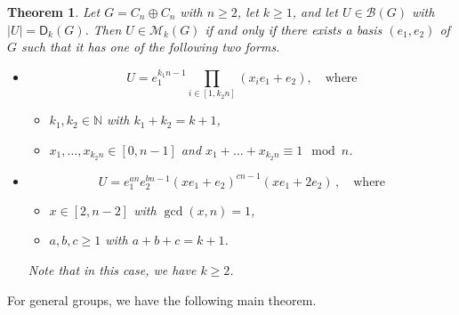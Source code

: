 \documentclass[11pt]{amsart}
\newtheorem{theorem}{Theorem}[section]
\theoremstyle{definition}
\newcommand{\N}{\mathbb N}
\numberwithin{equation}{section}
\begin{document}
\begin{theorem}\label{main1}
	Let  $G = C_{n} \oplus C_{n}$  with $n\ge 2$, let $k\ge 1$, and let $U\in \mathcal B(G)$ with $|U|=\mathsf D_k(G)$. Then  $U \in \mathcal M_k(G)$ 
	if and only if there exists a basis $(e_1,e_2)$ of $G$ such that it has one of the following two forms.
	\begin{itemize}
		\smallskip
		\item[(I)] \[
		U = e_1^{k_1n-1}  \prod_{i\in [1,k_2n]} (x_{i}e_1+e_2), \quad \text{where}
		\]
		\begin{itemize}
			\item[(a)] $k_1,k_2\in \N$ with $k_1+k_2=k+1$,
			\item[(b)] $x_1, \ldots, x_{k_2n}  \in [0, n-1]$ and $x_1 + \ldots + x_{k_2n} \equiv 1 \mod n$.
		\end{itemize}
	\end{itemize}
	
	
	
	\begin{itemize}
			\item[(II)] 
		\[
		U=e_1^{an} e_2^{bn-1} (xe_1+e_2)^{cn-1}  (xe_1+2e_2)\,, \quad \text{where}
		\]
		\begin{itemize}
			\item[(a)] $x\in [2,n-2]$ with $\gcd(x,n)=1$,
			\item[(b)] $a,b,c\geq 1$ with $a+b+c=k+1$.
		\end{itemize}
	
	Note that in this case, we have $k\ge 2$.
	\end{itemize}
\end{theorem}
   
 For general groups, we have the following  main theorem. 
   
\end{document}
